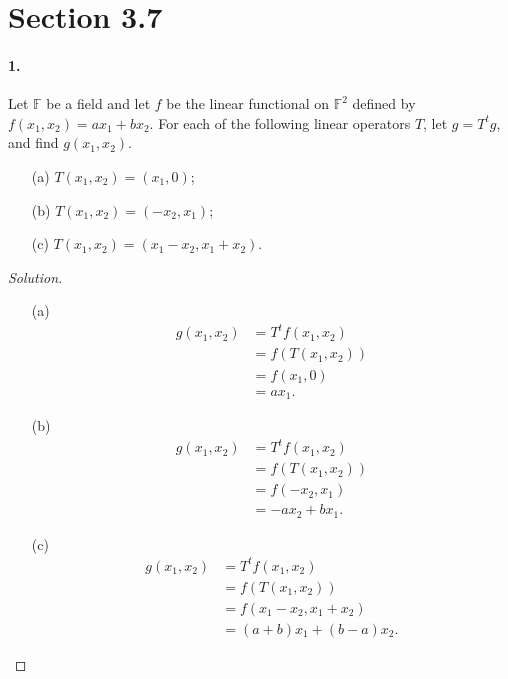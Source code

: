 \documentclass{article}
\theoremstyle{plain}
\theoremstyle{definition}
\theoremstyle{remark}
\newcommand{\Fi}{\mathbb{F}}
\begin{document}
  \section*{Section 3.7}

    \paragraph{1.}
    Let $\Fi$ be a field and let $f$ be the linear functional on $\Fi^2$ defined by $f(x_1,x_2)= ax_1+bx_2$. For each of the following linear operators $T$, let $g = T^t g$, and find $g(x_1,x_2)$.
    \begin{itemize}
      \item[(a)] $T(x_1,x_2)=(x_1,0)$;
      \item[(b)] $T(x_1,x_2)=(-x_2,x_1)$;
      \item[(c)] $T(x_1,x_2)=(x_1-x_2,x_1+x_2).$
    \end{itemize}
      \begin{proof}[Solution]$ $
        \begin{itemize}
          \item[(a)]
            \begin{align*}
              g(x_1,x_2)  & = T^t f(x_1,x_2)\\
                          & = f(T(x_1,x_2))\\
                          & = f(x_1,0)\\
                          & = ax_1.
            \end{align*}
          \item[(b)]
            \begin{align*}
              g(x_1,x_2)  & = T^tf(x_1,x_2)\\
                          & = f(T(x_1,x_2))\\
                          & = f(-x_2,x_1)\\
                          & = -ax_2 + bx_1.
            \end{align*}
          \item[(c)]
            \begin{align*}
              g(x_1,x_2)  & = T^tf(x_1,x_2)\\
                          & = f(T(x_1,x_2))\\
                          & = f(x_1-x_2,x_1+x_2)\\
                          & = (a+b)x_1 + (b-a)x_2.
            \end{align*}
        \end{itemize}
      \end{proof}
\end{document}
